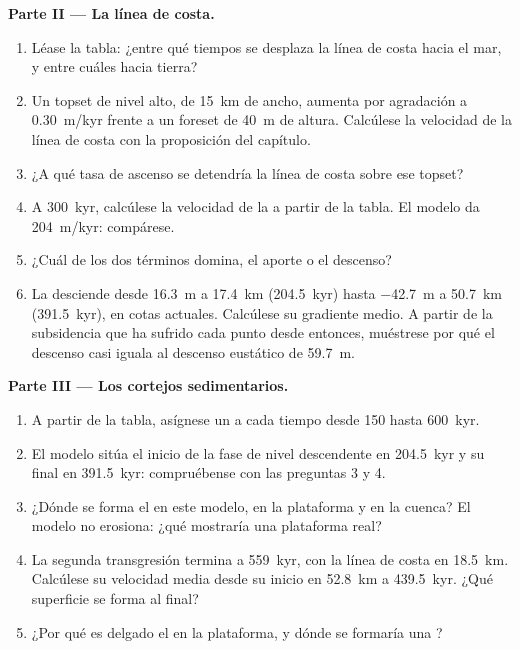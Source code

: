 \begin{problem}
\medskip\noindent\textbf{Parte II --- La línea de costa.}
\begin{enumerate}[resume]
\item Léase la tabla: ¿entre qué tiempos se desplaza la línea de costa hacia el mar,
  y entre cuáles hacia tierra?
\item Un topset de nivel alto, de \qty{15}{km} de ancho, aumenta por agradación a \qty{0.30}{m/kyr}
  frente a un foreset de \qty{40}{m} de altura. Calcúlese la velocidad de la
  línea de costa con la proposición del capítulo.
\item ¿A qué tasa de ascenso se detendría la línea de costa sobre ese topset?
\item A \qty{300}{kyr}, calcúlese la velocidad de la  a partir de
  la tabla. El modelo da \qty{204}{m/kyr}: compárese.
\item ¿Cuál de los dos términos domina, el aporte o el descenso?
\item La  desciende desde \qty{16.3}{m} a \qty{17.4}{km}
  (\qty{204.5}{kyr}) hasta \qty{-42.7}{m} a \qty{50.7}{km}
  (\qty{391.5}{kyr}), en cotas actuales. Calcúlese su gradiente medio.
  A partir de la subsidencia que ha sufrido cada punto desde entonces, muéstrese por qué el descenso
  casi iguala al descenso eustático de \qty{59.7}{m}.
\end{enumerate}

\medskip\noindent\textbf{Parte III --- Los cortejos sedimentarios.}
\begin{enumerate}[resume]
\item A partir de la tabla, asígnese un  a cada tiempo desde 150 hasta
  \qty{600}{kyr}.
\item El modelo sitúa el inicio de la fase de nivel descendente en \qty{204.5}{kyr}
  y su final en \qty{391.5}{kyr}: compruébense con las preguntas 3 y 4.
\item ¿Dónde se forma el  en este modelo, en la plataforma y
  en la cuenca? El modelo no erosiona: ¿qué mostraría una plataforma real?
\item La segunda transgresión termina a \qty{559}{kyr}, con la línea de costa en
  \qty{18.5}{km}. Calcúlese su velocidad media desde su inicio en \qty{52.8}{km} a
  \qty{439.5}{kyr}. ¿Qué superficie se forma al final?
\item ¿Por qué es delgado el  en la plataforma, y dónde se formaría una
  ?
\end{enumerate}


\end{problem}
